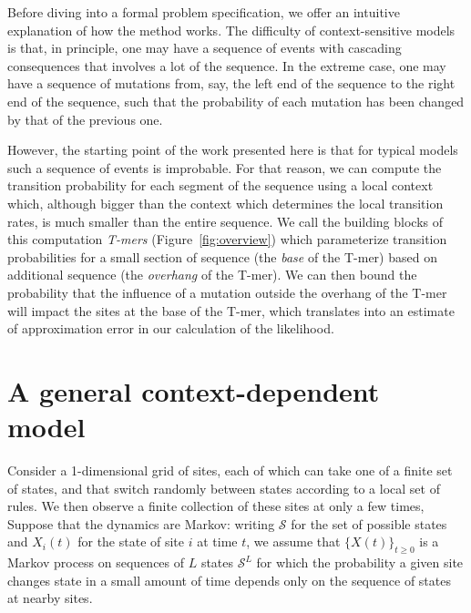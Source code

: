 \documentclass{article}
\newcommand{\calS}{\mathcal{S}}  %
\theoremstyle{plain}
\theoremstyle{definition}
\begin{document}
Before diving into a formal problem specification,
we offer an intuitive explanation of how the method works.
The difficulty of context-sensitive models is that, in principle,
one may have a sequence of events with cascading consequences that involves a lot of the sequence.
In the extreme case, one may have a sequence of mutations from,
say, the left end of the sequence to the right end of the sequence,
such that the probability of each mutation has been changed by that of the previous one.

However, the starting point of the work presented here is that
for typical models such a sequence of events is improbable.
For that reason, we can compute the transition probability for each segment of the sequence
using a local context which,
although bigger than the context which determines the local transition rates,
is much smaller than the entire sequence.
We call the building blocks of this computation \emph{T-mers} (Figure~\ref{fig:overview})
which parameterize transition probabilities for a small section of sequence
(the \emph{base} of the T-mer) based on additional sequence (the \emph{overhang} of the T-mer).
We can then bound the probability that the influence of a mutation
outside the overhang of the T-mer will impact the sites at the base of the T-mer,
which translates into an estimate of approximation error in our calculation of the likelihood.

\section{A general context-dependent model}

Consider a 1-dimensional grid of sites, each of which can take one of a finite set of states,
and that switch randomly between states according to a local set of rules.
We then observe a finite collection of these sites at only a few times,
Suppose that the dynamics are Markov:
writing $\calS$ for the set of possible states
and $X_i(t)$ for the state of site $i$ at time $t$,
we assume that $\{X(t)\}_{t \ge 0}$ is a Markov process on sequences of $L$ states $\calS^L$
for which the probability a given site changes state in a small amount of time
depends only on the sequence of states at nearby sites.
\end{document}
